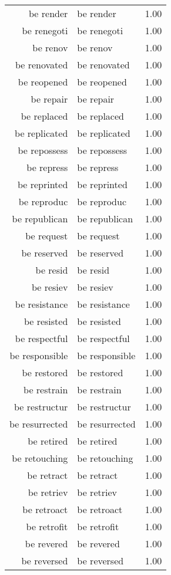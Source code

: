 \begin{table}[ht]
\begin{tabular}{rlr}
  be render & be render & 1.00 \\ 
  be renegoti & be renegoti & 1.00 \\ 
  be renov & be renov & 1.00 \\ 
  be renovated & be renovated & 1.00 \\ 
  be reopened & be reopened & 1.00 \\ 
  be repair & be repair & 1.00 \\ 
  be replaced & be replaced & 1.00 \\ 
  be replicated & be replicated & 1.00 \\ 
  be repossess & be repossess & 1.00 \\ 
  be repress & be repress & 1.00 \\ 
  be reprinted & be reprinted & 1.00 \\ 
  be reproduc & be reproduc & 1.00 \\ 
  be republican & be republican & 1.00 \\ 
  be request & be request & 1.00 \\ 
  be reserved & be reserved & 1.00 \\ 
  be resid & be resid & 1.00 \\ 
  be resiev & be resiev & 1.00 \\ 
  be resistance & be resistance & 1.00 \\ 
  be resisted & be resisted & 1.00 \\ 
  be respectful & be respectful & 1.00 \\ 
  be responsible & be responsible & 1.00 \\ 
  be restored & be restored & 1.00 \\ 
  be restrain & be restrain & 1.00 \\ 
  be restructur & be restructur & 1.00 \\ 
  be resurrected & be resurrected & 1.00 \\ 
  be retired & be retired & 1.00 \\ 
  be retouching & be retouching & 1.00 \\ 
  be retract & be retract & 1.00 \\ 
  be retriev & be retriev & 1.00 \\ 
  be retroact & be retroact & 1.00 \\ 
  be retrofit & be retrofit & 1.00 \\ 
  be revered & be revered & 1.00 \\ 
  be reversed & be reversed & 1.00 \\ 

\end{tabular}
\end{table}
